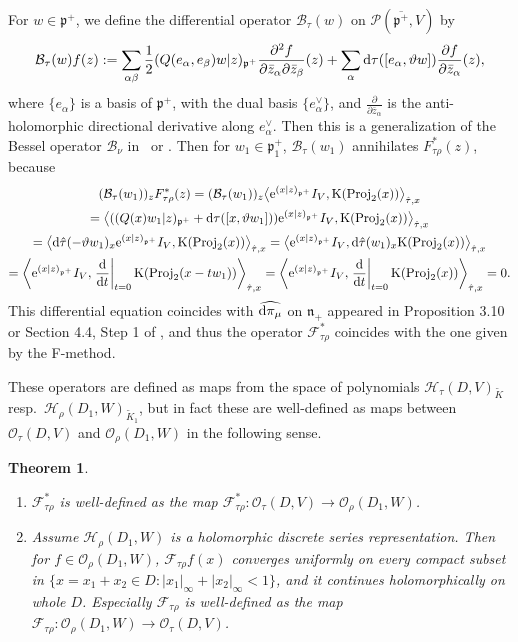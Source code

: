 \documentclass[pdftex]{sigma}
\numberwithin{equation}{section}
\newtheorem{Theorem}{Theorem}[section]
\newcommand{\fn}{\mathfrak{n}}
\newcommand{\fp}{\mathfrak{p}}
\newcommand{\cB}{\mathcal{B}}
\newcommand{\cF}{\mathcal{F}}
\newcommand{\cH}{\mathcal{H}}
\newcommand{\cO}{\mathcal{O}}
\newcommand{\cP}{\mathcal{P}}
\newcommand{\rK}{\mathrm{K}}
\newcommand{\Proj}{\operatorname{Proj}}
\begin{document}
\begin{Remark}
For $w\in\fp^+$, we define the differential operator $\cB_\tau(w)$ on $\cP(\overline{\fp^+},V)$ by
\begin{gather*} \cB_\tau(w)f(z):=\sum_{\alpha\beta}\frac{1}{2}(Q(e_\alpha,e_\beta)w|z)_{\fp^+}
\frac{\partial^2f}{\partial\bar{z}_\alpha\partial\bar{z}_\beta}(z)
+\sum_{\alpha}{\rm d}\tau([e_\alpha,\vartheta w])\frac{\partial f}{\partial \bar{z}_\alpha}(z), \end{gather*}
where $\{e_\alpha\}$ is a basis of $\fp^+$, with the dual basis $\{e_\alpha^\vee\}$,
and $\frac{\partial}{\partial\bar{z}_\alpha}$ is the anti-holomorphic directional derivative along $e_\alpha^\vee$.
Then this is a generalization of the Bessel operator $\cB_\nu$ in~\cite{D} or \cite[Section~XV.2]{FK}.
Then for $w_1\in\fp^+_1$, $\cB_\tau(w_1)$ annihilates $F_{\tau\rho}^*(z)$, because
\begin{gather*}
 (\cB_\tau(w_1))_zF_{\tau\rho}^*(z)
=(\cB_\tau(w_1))_z\big\langle {\rm e}^{(x|z)_{\fp^+}}I_V,\rK(\Proj_2(x))\big\rangle_{\hat{\tau},x} \\
 =\big\langle ((Q(x)w_1|z)_{\fp^+}+{\rm d}\tau([x,\vartheta w_1])){\rm e}^{(x|z)_{\fp^+}}I_V,\rK(\Proj_2(x))\big\rangle_{\hat{\tau},x} \\
 =\big\langle {\rm d}\hat{\tau}(-\vartheta w_1)_x{\rm e}^{(x|z)_{\fp^+}}I_V,\rK(\Proj_2(x))\big\rangle_{\hat{\tau},x}
=\big\langle {\rm e}^{(x|z)_{\fp^+}}I_V,{\rm d}\hat{\tau}(w_1)_x\rK(\Proj_2(x))\big\rangle_{\hat{\tau},x} \\
 =\left\langle {\rm e}^{(x|z)_{\fp^+}}I_V,\left.\frac{{\rm d}}{{\rm d}t}\right|_{t=0}\rK(\Proj_2(x-tw_1))\right\rangle_{\hat{\tau},x}
=\left\langle {\rm e}^{(x|z)_{\fp^+}}I_V,\left.\frac{{\rm d}}{{\rm d}t}\right|_{t=0}\rK(\Proj_2(x))\right\rangle_{\hat{\tau},x}=0.
\end{gather*}
This differential equation coincides with $\widehat{{\rm d}\pi_\mu}$ on $\fn_+$ appeared in Proposition 3.10 or Section 4.4, Step 1
of \cite{KP1}, and thus the operator $\cF_{\tau\rho}^*$ coincides with the one given by the F-method.
\end{Remark}
These operators are defined as maps from the space of polynomials $\cH_\tau(D,V)_{\tilde{K}}$ resp.\ \linebreak $\cH_\rho(D_1,W)_{\tilde{K}_1}$,
but in fact these are well-defined as maps between
$\cO_\tau(D,V)$ and $\cO_\rho(D_1,W)$ in the following sense.
\begin{Theorem}\label{extend}\quad
\begin{enumerate}\itemsep=0pt
\item[$(1)$] $\cF_{\tau\rho}^*$ is well-defined as the map $\cF_{\tau\rho}^*\colon \cO_\tau(D,V)\to\cO_\rho(D_1,W)$.
\item[$(2)$] Assume $\cH_\rho(D_1\!{,}W)$ is a holomorphic discrete series representation. Then for  $f{\in} \cO_\rho(D_1\!{,}W)$,
$\cF_{\tau\rho}f(x)$ converges uniformly on every compact subset in $\{x=x_1+x_2\in D\colon |x_1|_\infty+|x_2|_\infty\allowbreak <1\}$,
and it continues holomorphically on whole $D$. Especially $\cF_{\tau\rho}$ is well-defined as the map
$\cF_{\tau\rho}\colon \cO_\rho(D_1,W)\to \cO_\tau(D,V)$.
\end{enumerate}
\end{Theorem}
\end{document}
